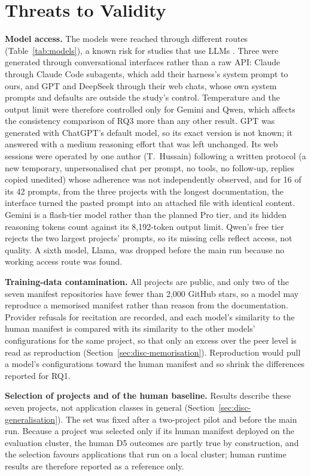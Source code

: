 \section{Threats to Validity}\label{sec:threats}

\textbf{Model access.} The models were reached through different routes (Table~\ref{tab:models}), a known risk for studies that use LLMs \citep{sallou2024breaking}. Three were generated through conversational interfaces rather than a raw API: Claude through Claude Code subagents, which add their harness's system prompt to ours, and GPT and DeepSeek through their web chats, whose own system prompts and defaults are outside the study's control. Temperature and the output limit were therefore controlled only for Gemini and Qwen, which affects the consistency comparison of RQ3 more than any other result. GPT was generated with ChatGPT's default model, so its exact version is not known; it answered with a medium reasoning effort that was left unchanged. Its web sessions were operated by one author (T.~Hussain) following a written protocol (a new temporary, unpersonalised chat per prompt, no tools, no follow-up, replies copied unedited) whose adherence was not independently observed, and for 16 of its 42 prompts, from the three projects with the longest documentation, the interface turned the pasted prompt into an attached file with identical content. Gemini is a flash-tier model rather than the planned Pro tier, and its hidden reasoning tokens count against its 8,192-token output limit. Qwen's free tier rejects the two largest projects' prompts, so its missing cells reflect access, not quality. A sixth model, Llama, was dropped before the main run because no working access route was found.

\textbf{Training-data contamination.} All projects are public, and only two of the seven manifest repositories have fewer than 2,000 GitHub stars, so a model may reproduce a memorised manifest rather than reason from the documentation. Provider refusals for recitation are recorded, and each model's similarity to the human manifest is compared with its similarity to the other models' configurations for the same project, so that only an excess over the peer level is read as reproduction (Section~\ref{sec:disc-memorisation}). Reproduction would pull a model's configurations toward the human manifest and so shrink the differences reported for RQ1.

\textbf{Selection of projects and of the human baseline.} Results describe these seven projects, not application classes in general (Section~\ref{sec:disc-generalisation}). The set was fixed after a two-project pilot and before the main run. Because a project was selected only if its human manifest deployed on the evaluation cluster, the human D5 outcomes are partly true by construction, and the selection favours applications that run on a local cluster; human runtime results are therefore reported as a reference only.

